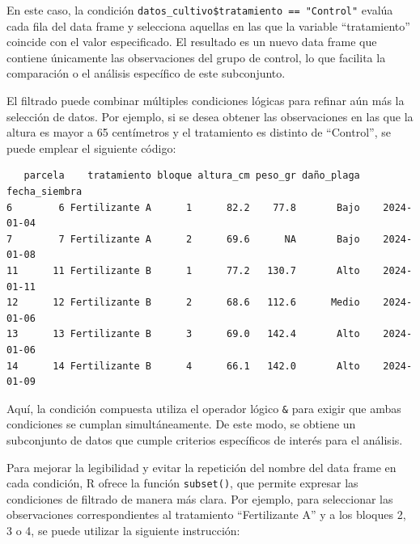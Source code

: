 \documentclass[
  spanish,
  a4paper,
  DIV=11,
  numbers=noendperiod,
  onepage,
  openany]{scrreprt}
\newenvironment{Shaded}{\begin{snugshade}}{\end{snugshade}}
\newcommand{\CommentTok}[1]{\textcolor[rgb]{0.37,0.37,0.37}{#1}}
\newcommand{\DecValTok}[1]{\textcolor[rgb]{0.68,0.00,0.00}{#1}}
\newcommand{\FunctionTok}[1]{\textcolor[rgb]{0.28,0.35,0.67}{#1}}
\newcommand{\NormalTok}[1]{\textcolor[rgb]{0.00,0.23,0.31}{#1}}
\newcommand{\OtherTok}[1]{\textcolor[rgb]{0.00,0.23,0.31}{#1}}
\newcommand{\SpecialCharTok}[1]{\textcolor[rgb]{0.37,0.37,0.37}{#1}}
\newcommand{\StringTok}[1]{\textcolor[rgb]{0.13,0.47,0.30}{#1}}
\begin{document}
En este caso, la condición
\texttt{datos\_cultivo\$tratamiento\ ==\ "Control"} evalúa cada fila del
data frame y selecciona aquellas en las que la variable ``tratamiento''
coincide con el valor especificado. El resultado es un nuevo data frame
que contiene únicamente las observaciones del grupo de control, lo que
facilita la comparación o el análisis específico de este subconjunto.

El filtrado puede combinar múltiples condiciones lógicas para refinar
aún más la selección de datos. Por ejemplo, si se desea obtener las
observaciones en las que la altura es mayor a 65 centímetros y el
tratamiento es distinto de ``Control'', se puede emplear el siguiente
código:

\begin{Shaded}
\end{Shaded}

\begin{verbatim}
   parcela    tratamiento bloque altura_cm peso_gr daño_plaga fecha_siembra
6        6 Fertilizante A      1      82.2    77.8       Bajo    2024-01-04
7        7 Fertilizante A      2      69.6      NA       Bajo    2024-01-08
11      11 Fertilizante B      1      77.2   130.7       Alto    2024-01-11
12      12 Fertilizante B      2      68.6   112.6      Medio    2024-01-06
13      13 Fertilizante B      3      69.0   142.4       Alto    2024-01-06
14      14 Fertilizante B      4      66.1   142.0       Alto    2024-01-09
\end{verbatim}

Aquí, la condición compuesta utiliza el operador lógico \texttt{\&} para
exigir que ambas condiciones se cumplan simultáneamente. De este modo,
se obtiene un subconjunto de datos que cumple criterios específicos de
interés para el análisis.

Para mejorar la legibilidad y evitar la repetición del nombre del data
frame en cada condición, R ofrece la función \texttt{subset()}, que
permite expresar las condiciones de filtrado de manera más clara. Por
ejemplo, para seleccionar las observaciones correspondientes al
tratamiento ``Fertilizante A'' y a los bloques 2, 3 o 4, se puede
utilizar la siguiente instrucción:
\end{document}
